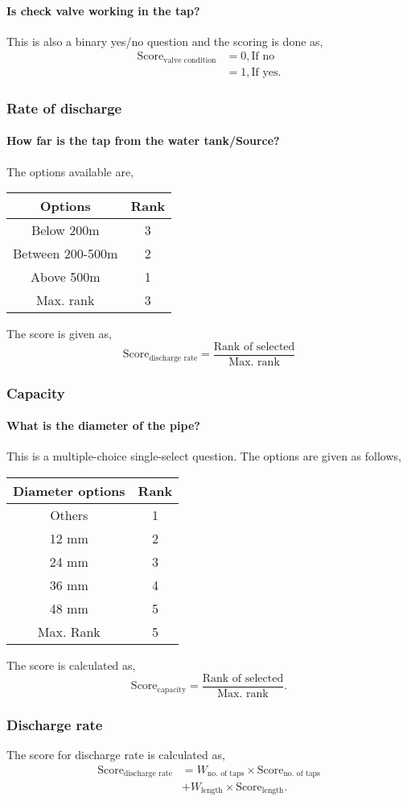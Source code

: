 \documentclass[oneside,twocolumn]{article}
\newcommand{\tsub}[2]{\text{#1}_{\text{#2}}}
\newcommand{\tsubb}[2]{#1_{\text{#2}}}
\newcommand{\dsub}[2]{\dfrac{\text{#1}}{\text{#2}}}
\newenvironment{ttable}
{
\begin{center}
\begin{tabular}{c|c}
\hline
}
{
\\ \hline
\end{tabular}
\end{center}
}
\begin{document}
\paragraph{Is check valve working in the tap?}
This is also a binary yes/no question and the scoring is done as,
\begin{align*}
	\tsub{Score}{valve condition} &= 0, \text{If no} \\
	&= 1, \text{If yes}.
\end{align*}

\subsubsection{Rate of discharge}
\paragraph{How far is the tap from the water tank/Source?}
The options available are,
\begin{ttable}
	Options & Rank \\ \hline
	Below 200m & 3 \\
	Between 200-500m & 2 \\
	Above 500m & 1 \\ \hline
	Max. rank & 3 
\end{ttable}
The score is given as,
\[
	\tsub{Score}{discharge rate} = \dsub{Rank of selected}{Max. rank}
\]

\subsubsection{Capacity}
\paragraph{What is the diameter of the pipe?}
This is a multiple-choice single-select question. The options are given as follows,
\begin{ttable}
	Diameter options & Rank \\ \hline
	Others & 1 \\
	12 mm & 2 \\
	24 mm & 3 \\
	36 mm & 4 \\
	48 mm & 5 \\ \hline
	Max. Rank & 5 
\end{ttable}
The score is calculated as,
\[
	\tsub{Score}{capacity} = \dsub{Rank of selected}{Max. rank}.
\]

\subsubsection{Discharge rate}
The score for discharge rate is calculated as,
\begin{align*}
	\tsub{Score}{discharge rate} &= \tsubb{W}{no. of taps} \times \tsub{Score}{no. of taps} \\
	&+ \tsubb{W}{length} \times \tsub{Score}{length}.
\end{align*}
\end{document}
